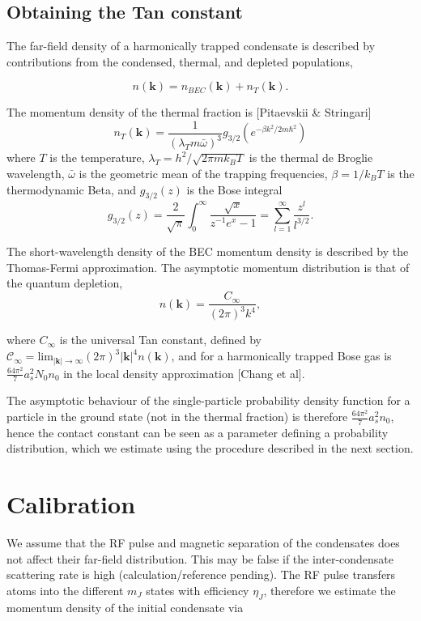 \documentclass[%
 reprint,
 amsmath,amssymb,
 aps,
]{revtex4-1}
\begin{document}
\subsection{Obtaining the Tan constant}

The far-field density of a harmonically trapped condensate is described by contributions from the condensed, thermal, and depleted populations,

\begin{equation}
        n(\textbf{k}) = n_{BEC}(\textbf{k}) + n_{T}(\textbf{k}).
\end{equation}

The momentum density of the thermal fraction is [Pitaevskii \& Stringari]
$$
n_{T}(\textbf{k}) = \frac{1}{\left(\lambda_T m \bar{\omega}\right)^3} g_{3/2}\left(e^{-\beta k^2/2m\hbar^2}\right)
$$
where $T$ is the temperature, $\lambda_T = h^2/\sqrt{2\pi m k_B T}$ is the thermal de Broglie wavelength, $\bar{\omega}$ is the geometric mean of the trapping frequencies, $\beta=1/ k_B T$ is the thermodynamic Beta, and $g_{3/2}(z)$ is the Bose integral 
$$
g_{3/2}(z) = \frac{2}{\sqrt{\pi}}\int_0^\infty \frac{\sqrt{x}}{z^{-1}e^x-1}=\sum_{l=1}^\infty \frac{z^l}{l^{3/2}}.
$$

The short-wavelength density of the BEC momentum density is described by the Thomas-Fermi approximation. The asymptotic momentum distribution is that of the quantum depletion,
$$
n(\textbf{k}) = \frac{C_\infty}{(2\pi)^3 k^4},
$$

where $C_\infty$ is the universal Tan constant, defined by $\mathcal{C}_{\infty}=\textrm{lim}_{|\textbf{k}|\to\infty}(2\pi)^3 |\textbf{k}|^4 n(\textbf{k})$, and for a harmonically trapped Bose gas is $\frac{64\pi^2}{7}a_{s}^{2}N_0 n_0$ in the local density approximation [Chang et al].

The asymptotic behaviour of the single-particle probability density function for a particle in the ground state (not in the thermal fraction) is therefore $\frac{64\pi^2}{7}a_{s}^{2} n_0$, hence the contact constant can be seen as a parameter defining a probability distribution, which we estimate using the procedure described in the next section.

\section{\label{calibration}Calibration}


We assume that the RF pulse and magnetic separation of the condensates does not affect their far-field distribution. 
This may be false if the inter-condensate scattering rate is high (calculation/reference pending).
The RF pulse transfers atoms into the different $m_J$ states with efficiency $\eta_J$, therefore we estimate the momentum density of the initial condensate via
\end{document}
